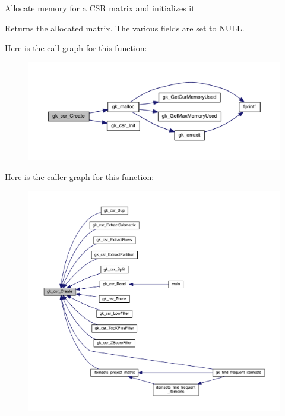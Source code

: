Allocate memory for a C\+SR matrix and initializes it \begin{DoxyReturn}{Returns}
the allocated matrix. The various fields are set to N\+U\+LL. 
\end{DoxyReturn}
Here is the call graph for this function\+:\nopagebreak
\begin{figure}[H]
\begin{center}
\leavevmode
\includegraphics[width=350pt]{a00077_a82b885bbed5bd18c26629c35ce5d37e4_cgraph}
\end{center}
\end{figure}
Here is the caller graph for this function\+:\nopagebreak
\begin{figure}[H]
\begin{center}
\leavevmode
\includegraphics[width=350pt]{a00077_a82b885bbed5bd18c26629c35ce5d37e4_icgraph}
\end{center}
\end{figure}
\mbox{\label{a00077_a8bdd383ab80fe76507463f59c3d2863a}} 
